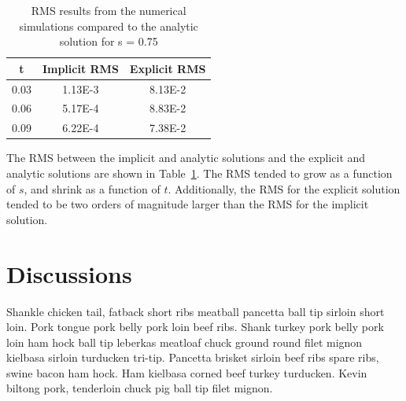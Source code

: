 \documentclass[twocolumn,10pt]{asme2ej}
\begin{document}
\begin{table}[h]
\begin{center}
\label{table_ASME}
\begin{tabular}{|c | c c|}
\hline
t & Implicit RMS & Explicit RMS \\
\hline
0.03 & 1.13E-3 & 8.13E-2 \\
0.06 & 5.17E-4 & 8.83E-2\\
0.09 & 6.22E-4 & 7.38E-2 \\
\hline
\end{tabular}
\caption{RMS results from the numerical simulations compared to the analytic solution for s = 0.75}
\end{center}
\end{table}


The RMS between the implicit and analytic solutions and the explicit and analytic solutions are shown in Table~\ref{table_ASME}. The RMS tended to grow as a function of $s$, and shrink as a function of $t$. Additionally, the RMS for the explicit solution tended to be two orders of magnitude larger than the RMS for the implicit solution.

\section{Discussions}
Shankle chicken tail, fatback short ribs meatball pancetta ball tip sirloin short loin. Pork tongue pork belly pork loin beef ribs. Shank turkey pork belly pork loin ham hock ball tip leberkas meatloaf chuck ground round filet mignon kielbasa sirloin turducken tri-tip. Pancetta brisket sirloin beef ribs spare ribs, swine bacon ham hock. Ham kielbasa corned beef turkey turducken. Kevin biltong pork, tenderloin chuck pig ball tip filet mignon.

%
\end{document}
